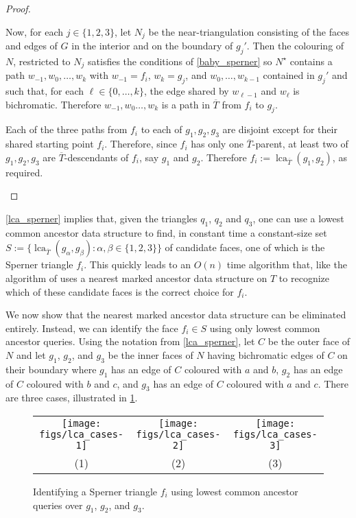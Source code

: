 \documentclass{patmorin}
\DeclareMathOperator{\lca}{lca}
\begin{document}
\begin{proof}
\begin{enumerate}
    Now, for each $j\in\{1,2,3\}$, let $N_j$ be the near-triangulation consisting of the faces and edges of $G$ in the interior and on the boundary of $g_j'$.  Then the colouring of $N$, restricted to $N_j$ satisfies the conditions of \cref{baby_sperner} so $N^\star$ contains a path $w_{-1},w_0,\ldots,w_{k}$ with $w_{-1}=f_i$, $w_{k}=g_j$, and $w_0,\ldots,w_{k-1}$ contained in $g_j'$ and such that, for each $\ell\in\{0,\ldots,k\}$, the edge shared by $w_{\ell-1}$ and $w_\ell$ is bichromatic.  Therefore $w_{-1},w_0\ldots,w_k$ is a path in $\overline{T}$ from $f_i$ to $g_j$.

    Each of the three paths from $f_i$ to each of $g_1,g_2,g_3$ are disjoint except for their shared starting point $f_i$.  Therefore, since $f_i$ has only one $\overline{T}$-parent, at least two of $g_1,g_2,g_3$ are $\overline{T}$-descendants of $f_i$, say $g_1$ and $g_2$.  Therefore $f_i:=\lca_{\overline{T}}(g_1,g_2)$, as required. \qedhere
  \end{enumerate}
\end{proof}

\cref{lca_sperner} implies that, given the triangles $q_1$, $q_2$ and $q_3$, one can use a lowest common ancestor data structure to find, in constant time a constant-size set $S:=\{\lca_{\overline{T}}(g_\alpha,g_\beta):\alpha,\beta\in\{1,2,3\}\}$ of candidate faces, one of which is the Sperner triangle $f_i$.
This quickly leads to an $O(n)$ time algorithm that, like the algorithm of \citet{morin:fast} uses a nearest marked ancestor data structure on $T$ to recognize which of these candidate faces is the correct choice for $f_i$.

We now show that the nearest marked ancestor data structure can be eliminated entirely. Instead, we can identify the face $f_i\in S$ using only lowest common ancestor queries.  Using the notation from \cref{lca_sperner}, let $C$ be the outer face of $N$ and let $g_1$, $g_2$, and $g_3$ be the inner faces of $N$ having bichromatic edges of $C$ on their boundary where $g_1$ has an edge of $C$ coloured with $a$ and $b$, $g_2$ has an edge of $C$ coloured with $b$ and $c$, and $g_3$ has an edge of $C$ coloured with $a$ and $c$.  There are three cases, illustrated in \cref{lca_cases}.

\begin{figure}
  \begin{center}
    \begin{tabular}{ccc}
      \texttt{[image: figs/lca\_cases-1]} &
      \texttt{[image: figs/lca\_cases-2]} &
      \texttt{[image: figs/lca\_cases-3]} \\
      (1) & (2) & (3)
    \end{tabular}
  \end{center}
  \caption{Identifying a Sperner triangle $f_i$ using lowest common ancestor queries over $g_1$, $g_2$, and $g_3$.}
  \label{lca_cases}
\end{figure}
\end{document}
